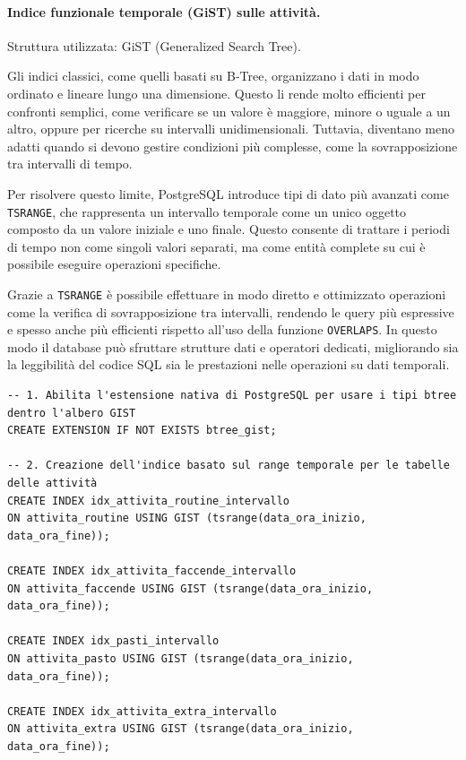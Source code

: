 \documentclass[11pt,a4paper]{article}
\begin{document}
\paragraph{Indice funzionale temporale (GiST) sulle attività.}
Struttura utilizzata: GiST (Generalized Search Tree).

Gli indici classici, come quelli basati su B-Tree, organizzano i dati in modo ordinato e
lineare lungo una dimensione. Questo li rende molto efficienti per confronti semplici, come
verificare se un valore è maggiore, minore o uguale a un altro, oppure per ricerche su
intervalli unidimensionali. Tuttavia, diventano meno adatti quando si devono gestire condizioni
più complesse, come la sovrapposizione tra intervalli di tempo.

Per risolvere questo limite, PostgreSQL introduce tipi di dato più avanzati come
\texttt{TSRANGE}, che rappresenta un intervallo temporale come un unico oggetto composto da un
valore iniziale e uno finale. Questo consente di trattare i periodi di tempo non come singoli
valori separati, ma come entità complete su cui è possibile eseguire operazioni specifiche.

Grazie a \texttt{TSRANGE} è possibile effettuare in modo diretto e ottimizzato operazioni come
la verifica di sovrapposizione tra intervalli, rendendo le query più espressive e spesso anche
più efficienti rispetto all'uso della funzione \texttt{OVERLAPS}. In questo modo il database
può sfruttare strutture dati e operatori dedicati, migliorando sia la leggibilità del codice SQL
sia le prestazioni nelle operazioni su dati temporali.

\begin{verbatim}
-- 1. Abilita l'estensione nativa di PostgreSQL per usare i tipi btree dentro l'albero GIST
CREATE EXTENSION IF NOT EXISTS btree_gist;

-- 2. Creazione dell'indice basato sul range temporale per le tabelle delle attività
CREATE INDEX idx_attivita_routine_intervallo
ON attivita_routine USING GIST (tsrange(data_ora_inizio, data_ora_fine));

CREATE INDEX idx_attivita_faccende_intervallo
ON attivita_faccende USING GIST (tsrange(data_ora_inizio, data_ora_fine));

CREATE INDEX idx_pasti_intervallo
ON attivita_pasto USING GIST (tsrange(data_ora_inizio, data_ora_fine));

CREATE INDEX idx_attivita_extra_intervallo
ON attivita_extra USING GIST (tsrange(data_ora_inizio, data_ora_fine));
\end{verbatim}
\end{document}
